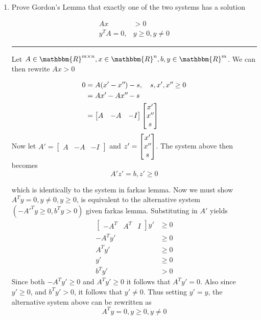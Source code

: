 \documentclass{article} %
\newcommand{\R}{\mathbbm{R}}
\newcommand*{\dprime}{^{\prime\prime}\mkern-1.2mu}
\begin{document}
\begin{enumerate}
\item Prove Gordon's Lemma  that exactly one of the two systems has a solution  

\begin{equation*}
\begin{aligned}
Ax &> 0 \\ 
y^{T}A = 0 , &y \geq 0, y \neq 0
\end{aligned}
\end{equation*}
\rule{\textwidth}{1pt}
Let $A \in \R^{m \times n}, x \in \R^n, b, y \in \R^{m}$. We can then rewrite $Ax >0$

\begin{equation*}
\begin{aligned}
0 & = A(x' - x \dprime ) - s , \quad s, x', x \dprime \geq 0 \\ 
&= Ax' - A x \dprime - s \\ 
&= \begin{bmatrix} A & -A  & - I \end{bmatrix} \begin{bmatrix} x' \\ x\dprime  \\ s\end{bmatrix}
\end{aligned}
\end{equation*}
Now let $A' =\begin{bmatrix} A & -A  & - I \end{bmatrix}$ and $z' =\begin{bmatrix} x' \\ x\dprime  \\ s\end{bmatrix}$. The system above then becomes
\[
A' z' = b, z' \geq 0
\]

which is identically to the system in farkas lemma. Now we must show $A^T y = 0, y \neq 0, y \geq 0$, is equivalent to  the alternative system $(-A'^T y \geq 0, b^T y > 0)$ given farkas lemma. Substituting in $A'$ yields
\begin{equation*}
\begin{aligned}
\begin{bmatrix} -A^T & A^T  & I \end{bmatrix} y' & \geq 0  \\ 
-A^T y' &\geq 0  \\ 
A^T y' &\geq 0  \\ 
y' &\geq 0 \\ 
b^T y' & >  0
\end{aligned}
\end{equation*}
Since both $-A^T y' \geq 0$ and $A^{T} y' \geq 0$ it follows that $A^T y' = 0$. Also since $y' \geq 0$, and $b^{T} y' > 0$, it follows that $y' \neq 0$. Thus setting $y' = y$, the alternative system above can be rewritten as 
\[
A^Ty = 0, y \geq 0, y \neq 0
\]


\end{enumerate}
\end{document}
